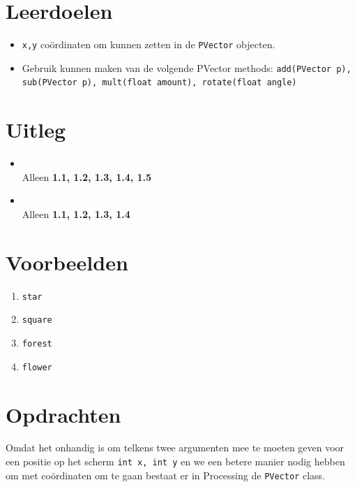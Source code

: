 \documentclass{../qh_exercise}
\begin{document}
\section{Leerdoelen}
\begin{itemize}
	\item \texttt{x,y} co\"ordinaten om kunnen zetten in de \texttt{PVector} objecten.
	\item Gebruik kunnen maken van de volgende PVector methods: \texttt{add(PVector p), sub(PVector p), mult(float amount), rotate(float angle)}
\end{itemize}

\section{Uitleg}
\begin{itemize}
\item{}\\Alleen \textbf{1.1, 1.2, 1.3, 1.4, 1.5}
\item{}\\Alleen \textbf{1.1, 1.2, 1.3, 1.4}
\end{itemize}

\section{Voorbeelden}
\begin{enumerate}
	\item \texttt{star}
	\item \texttt{square}
	\item \texttt{forest}
	\item \texttt{flower}
\end{enumerate}

\newpage
\section{Opdrachten}
Omdat het onhandig is om telkens twee argumenten mee te moeten geven voor een positie op het scherm \texttt{int x, int y} en we een betere manier nodig hebben om met co\"ordinaten om te gaan bestaat er in Processing de \texttt{PVector} class.
\end{document}
